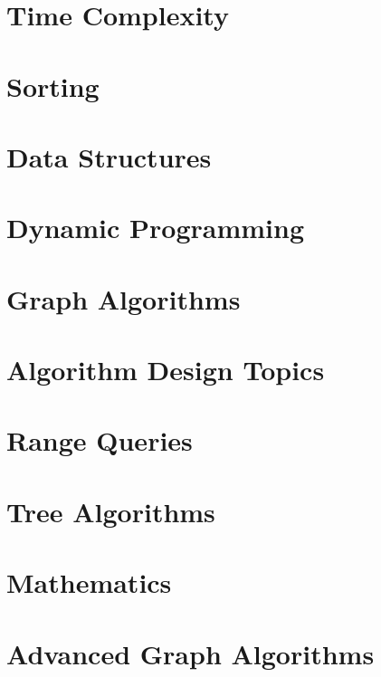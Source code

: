\documentclass[12pt,letterpaper]{book}
\theoremstyle{definition}
\theoremstyle{remark}
\begin{document}
\chapter{Time Complexity}


\chapter{Sorting}


\chapter{Data Structures}


\chapter{Dynamic Programming}


\chapter{Graph Algorithms}


\chapter{Algorithm Design Topics}


\chapter{Range Queries}


\chapter{Tree Algorithms}


\chapter{Mathematics}


\chapter{Advanced Graph Algorithms}
\end{document}

